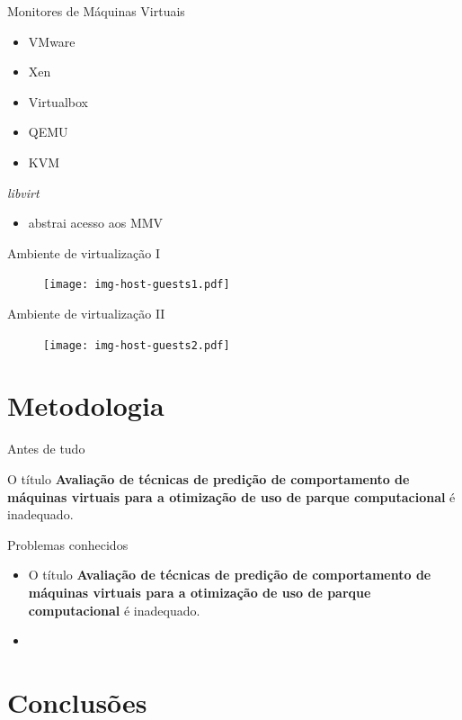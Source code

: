 \documentclass{beamer}
\begin{document}
\begin{frame}{Monitores de Máquinas Virtuais}
\begin{itemize}
  \item VMware
  \item Xen
  \item Virtualbox
  \item QEMU
  \item KVM
\end{itemize}
\end{frame}

\begin{frame}{\emph{libvirt}}
\begin{itemize}
  \item abstrai acesso aos MMV
\end{itemize}
\end{frame}

\begin{frame}{Ambiente de virtualização I}
\begin{figure}
\centering
%
%
\texttt{[image: img-host-guests1.pdf]}
\end{figure}
\end{frame}

\begin{frame}{Ambiente de virtualização II}
\begin{figure}
\texttt{[image: img-host-guests2.pdf]}
\end{figure}
\end{frame}

\section{Metodologia}

\begin{frame}{Antes de tudo}
\begin{block}{}
O título \textbf{Avaliação de técnicas de predição de comportamento de máquinas
virtuais para a otimização de uso de parque computacional} é inadequado.
\end{block}
\end{frame}

\begin{frame}{Problemas conhecidos}
\begin{itemize}
  \item O título \textbf{Avaliação de técnicas de predição de comportamento
        de máquinas virtuais para a otimização de uso de parque computacional} é
        inadequado.
  \item 
\end{itemize}
\end{frame}

\section{Conclusões}
\end{document}
